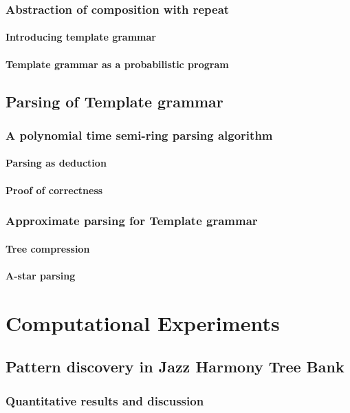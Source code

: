     \section{Abstraction of composition with repeat}
        \subsection{Introducing template grammar}
        \subsection{Template grammar as a probabilistic program}
\chapter{Parsing of Template grammar}
    \section{A polynomial time semi-ring parsing algorithm}
        \subsection{Parsing as deduction}
        \subsection{Proof of correctness}
    \section{Approximate parsing for Template grammar}
        \subsection{Tree compression}
        \subsection{A-star parsing}


    

\cleardoublepage
\part{Computational Experiments}
\chapter{Pattern discovery in Jazz Harmony Tree Bank}
    \section{Quantitative results and discussion}
